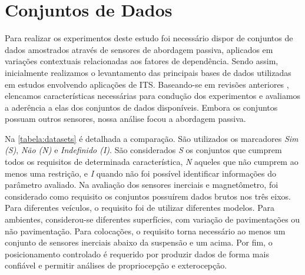 \chapter{Conjuntos de Dados}
\label{cap:conjuntos_de_dados}

Para realizar os experimentos deste estudo foi necessário dispor de conjuntos de dados amostrados através de sensores de abordagem passiva, aplicados em variações contextuais relacionadas aos fatores de dependência. Sendo assim, inicialmente realizamos o levantamento das principais bases de dados utilizadas em estudos envolvendo aplicações de ITS. Baseando-se em revisões anteriores \cite{Geyer2020}, elencamos características necessárias para condução dos experimentos e avaliamos a aderência a elas dos conjuntos de dados disponíveis. Embora os conjuntos possuam outros sensores, nossa análise focou a abordagem passiva.

Na \autoref{tabela:datasets} é detalhada a comparação. São utilizados os marcadores \emph{Sim (S)}, \emph{Não (N)} e \emph{Indefinido (I)}. São considerados \emph{S} os conjuntos que cumprem todos os requisitos de determinada característica, \emph{N} aqueles que não cumprem ao menos uma restrição, e \emph{I} quando não foi possível identificar informações do parâmetro avaliado. Na avaliação dos sensores inerciais e magnetômetro, foi considerado como requisito os conjuntos possuírem dados brutos nos três eixos. Para diferentes veículos, o requisito foi de utilizar diferentes modelos. Para ambientes, considerou-se diferentes superfícies, com variação de pavimentações ou não pavimentação. Para colocações, o requisito torna necessário ao menos um conjunto de sensores inerciais abaixo da suspensão e um acima. Por fim, o posicionamento controlado é requerido por produzir dados de forma mais confiável e permitir análises de propriocepção e exterocepção.

